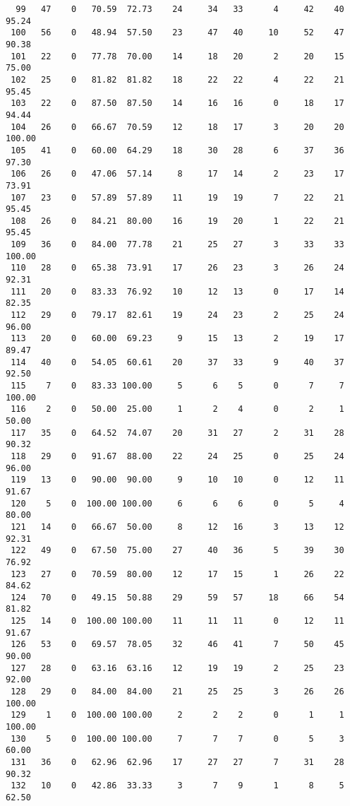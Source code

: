 \begin{verbatim}
  99   47    0   70.59  72.73    24     34   33      4     42    40    95.24
 100   56    0   48.94  57.50    23     47   40     10     52    47    90.38
 101   22    0   77.78  70.00    14     18   20      2     20    15    75.00
 102   25    0   81.82  81.82    18     22   22      4     22    21    95.45
 103   22    0   87.50  87.50    14     16   16      0     18    17    94.44
 104   26    0   66.67  70.59    12     18   17      3     20    20   100.00
 105   41    0   60.00  64.29    18     30   28      6     37    36    97.30
 106   26    0   47.06  57.14     8     17   14      2     23    17    73.91
 107   23    0   57.89  57.89    11     19   19      7     22    21    95.45
 108   26    0   84.21  80.00    16     19   20      1     22    21    95.45
 109   36    0   84.00  77.78    21     25   27      3     33    33   100.00
 110   28    0   65.38  73.91    17     26   23      3     26    24    92.31
 111   20    0   83.33  76.92    10     12   13      0     17    14    82.35
 112   29    0   79.17  82.61    19     24   23      2     25    24    96.00
 113   20    0   60.00  69.23     9     15   13      2     19    17    89.47
 114   40    0   54.05  60.61    20     37   33      9     40    37    92.50
 115    7    0   83.33 100.00     5      6    5      0      7     7   100.00
 116    2    0   50.00  25.00     1      2    4      0      2     1    50.00
 117   35    0   64.52  74.07    20     31   27      2     31    28    90.32
 118   29    0   91.67  88.00    22     24   25      0     25    24    96.00
 119   13    0   90.00  90.00     9     10   10      0     12    11    91.67
 120    5    0  100.00 100.00     6      6    6      0      5     4    80.00
 121   14    0   66.67  50.00     8     12   16      3     13    12    92.31
 122   49    0   67.50  75.00    27     40   36      5     39    30    76.92
 123   27    0   70.59  80.00    12     17   15      1     26    22    84.62
 124   70    0   49.15  50.88    29     59   57     18     66    54    81.82
 125   14    0  100.00 100.00    11     11   11      0     12    11    91.67
 126   53    0   69.57  78.05    32     46   41      7     50    45    90.00
 127   28    0   63.16  63.16    12     19   19      2     25    23    92.00
 128   29    0   84.00  84.00    21     25   25      3     26    26   100.00
 129    1    0  100.00 100.00     2      2    2      0      1     1   100.00
 130    5    0  100.00 100.00     7      7    7      0      5     3    60.00
 131   36    0   62.96  62.96    17     27   27      7     31    28    90.32
 132   10    0   42.86  33.33     3      7    9      1      8     5    62.50

\end{verbatim}

